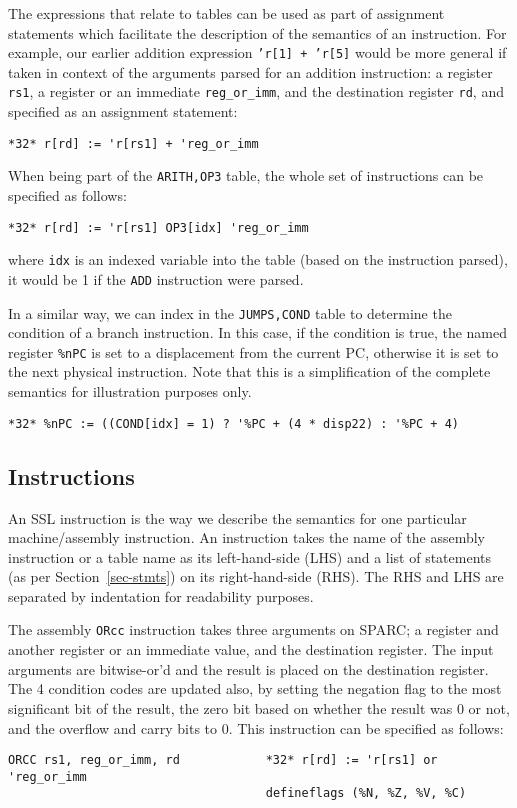 The expressions that relate to tables can be used as part of 
assignment statements which facilitate the description of the
semantics of an instruction.  For example, our earlier addition 
expression \texttt{'r[1] + 'r[5]} would be more general if taken
in context of the arguments parsed for an addition instruction:
a register \texttt{rs1}, a register or an immediate \texttt{reg\_or\_imm},
and the destination register \texttt{rd}, and specified as an 
assignment statement: 
\begin{verbatim}
*32* r[rd] := 'r[rs1] + 'reg_or_imm
\end{verbatim}
When being part of the \texttt{ARITH,OP3} table, the whole set of 
instructions can be specified as follows:
\begin{verbatim}
*32* r[rd] := 'r[rs1] OP3[idx] 'reg_or_imm
\end{verbatim}
where \texttt{idx} is an indexed variable into the table (based
on the instruction parsed), it would be 1 if the \texttt{ADD} 
instruction were parsed.

In a similar way, we can index in the \texttt{JUMPS,COND} table 
to determine the condition of a branch instruction.  In this case,
if the condition is true, the named register \texttt{\%nPC} is set
to a displacement from the current PC, otherwise it is set to the
next physical instruction.  Note that this is a simplification of
the complete semantics for illustration purposes only.
\begin{verbatim}
*32* %nPC := ((COND[idx] = 1) ? '%PC + (4 * disp22) : '%PC + 4)
\end{verbatim}


\subsection{Instructions}
\label{sec-insts}
An SSL instruction is the way we describe the semantics for one
particular machine/assembly instruction.  An instruction takes
the name of the assembly instruction or a table name as its left-hand-side 
(LHS) and a list of statements (as per Section~\ref{sec-stmts}) on
its right-hand-side (RHS).
The RHS and LHS are separated by indentation for readability 
purposes.

The assembly \texttt{ORcc} instruction takes three arguments on SPARC; 
a register and another register or an immediate value, and the 
destination register.  The input arguments are bitwise-or'd and 
the result is placed on the destination register.  The 4 condition 
codes are updated also, by setting the negation flag to the most
significant bit of the result, the zero bit based on whether the
result was 0 or not, and the overflow and carry bits to 0. 
This instruction can be specified as follows:
\begin{verbatim}
ORCC rs1, reg_or_imm, rd            *32* r[rd] := 'r[rs1] or 'reg_or_imm
                                    defineflags (%N, %Z, %V, %C)
\end{verbatim}

